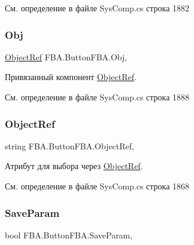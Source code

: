 См. определение в файле Sys\+Comp.\+cs строка 1882

\mbox{\label{class_f_b_a_1_1_button_f_b_a_a9e0dc338ce76e2aa933cf8ddae7486b8}} 
\subsubsection{\texorpdfstring{Obj}{Obj}}
{\footnotesize\ttfamily \mbox{\hyperlink{class_f_b_a_1_1_object_ref}{Object\+Ref}} F\+B\+A.\+Button\+F\+B\+A.\+Obj\hspace{0.3cm}{\ttfamily [get]}, {\ttfamily [set]}}



Привязанный компонент \mbox{\hyperlink{class_f_b_a_1_1_object_ref}{Object\+Ref}}. 



См. определение в файле Sys\+Comp.\+cs строка 1888

\mbox{\label{class_f_b_a_1_1_button_f_b_a_a09d51acbcf79fa8696033f71a73332c8}} 
\subsubsection{\texorpdfstring{Object\+Ref}{ObjectRef}}
{\footnotesize\ttfamily string F\+B\+A.\+Button\+F\+B\+A.\+Object\+Ref\hspace{0.3cm}{\ttfamily [get]}, {\ttfamily [set]}}



Атрибут для выбора через \mbox{\hyperlink{class_f_b_a_1_1_object_ref}{Object\+Ref}}. ~\newline




См. определение в файле Sys\+Comp.\+cs строка 1868

\mbox{\label{class_f_b_a_1_1_button_f_b_a_a6cb2000b6e50e5eed0f7dea8e9d2f867}} 
\subsubsection{\texorpdfstring{Save\+Param}{SaveParam}}
{\footnotesize\ttfamily bool F\+B\+A.\+Button\+F\+B\+A.\+Save\+Param\hspace{0.3cm}{\ttfamily [get]}, {\ttfamily [set]}}



